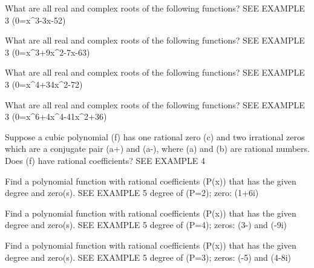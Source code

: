 \documentclass{article}
\newenvironment{practice}[2]{}{}        %
\newcommand{\answer}[1]{}               %
\newcommand{\te}[1]{}                   %
\begin{document}
\begin{practice}{25}{1}
What are all real and complex roots of the following functions? SEE EXAMPLE 3
(0=x^3-3x-52)
\answer{(\{4,-2+3i,-2-3i\})}
\end{practice}
\begin{practice}{26}{1}
What are all real and complex roots of the following functions? SEE EXAMPLE 3
(0=x^3+9x^2-7x-63)
\answer{(\{-9,\sqrt{7},-\sqrt{7}\})}
\end{practice}
\begin{practice}{27}{1}
What are all real and complex roots of the following functions? SEE EXAMPLE 3
(0=x^4+34x^2-72)
\answer{(\{6i,-6i,\sqrt{2},-\sqrt{2}\})}
\end{practice}
\begin{practice}{28}{1}
What are all real and complex roots of the following functions? SEE EXAMPLE 3
(0=x^6+4x^4-41x^2+36)
\answer{(\{-1,1,3i,-3i,2,-2\})}
\end{practice}
\begin{practice}{29}{2}
Suppose a cubic polynomial (f) has one rational zero (c) and two irrational zeros which are a conjugate pair (a+) and (a-), where (a) and (b) are rational numbers. Does (f) have rational coefficients? SEE EXAMPLE 4
\answer{yes}
\te{The printed affirmative answer assumes a rational leading coefficient.}
\end{practice}
\begin{practice}{30}{1}
Find a polynomial function with rational coefficients (P(x)) that has the given degree and zero(s). SEE EXAMPLE 5
degree of (P=2); zero: (1+6i)
\answer{(P(x)=x^2-2x+37)}
\end{practice}
\begin{practice}{31}{1}
Find a polynomial function with rational coefficients (P(x)) that has the given degree and zero(s). SEE EXAMPLE 5
degree of (P=4); zeros: (3-) and (-9i)
\answer{(P(x)=x^4-6x^3+79x^2-486x-162)}
\end{practice}
\begin{practice}{32}{1}
Find a polynomial function with rational coefficients (P(x)) that has the given degree and zero(s). SEE EXAMPLE 5
degree of (P=3); zeros: (-5) and (4-8i)
\answer{(P(x)=x^3-3x^2+40x+400)}
\end{practice}
\end{document}
